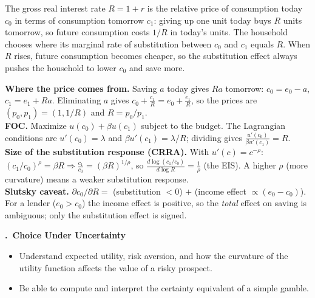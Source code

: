 \documentclass[11pt]{article}
\newcounter{qn}
\newcommand{\question}[1]{\par\needspace{14\baselineskip}\refstepcounter{qn}\medskip
{\bfseries\color{ink}\large \theqn.\ #1}\par\smallskip}
\begin{document}
\begin{resp}
The gross real interest rate $R=1+r$ is the relative price of consumption today $c_0$ in terms of consumption tomorrow $c_1$: giving up one unit today buys $R$ units tomorrow, so future consumption costs $1/R$ in today's units. The household chooses where its marginal rate of substitution between $c_0$ and $c_1$ equals $R$. When $R$ rises, future consumption becomes cheaper, so the substitution effect always pushes the household to lower $c_0$ and save more.
\end{resp}
\begin{intu}
\textbf{Where the price comes from.} Saving $a$ today gives $Ra$ tomorrow: $c_0=e_0-a$, $c_1=e_1+Ra$. Eliminating $a$ gives $c_0+\frac{c_1}{R}=e_0+\frac{e_1}{R}$, so the prices are $(p_0,p_1)=(1,1/R)$ and $R=p_0/p_1$.\\
\textbf{FOC.} Maximize $u(c_0)+\beta u(c_1)$ subject to the budget. The Lagrangian conditions are $u'(c_0)=\lambda$ and $\beta u'(c_1)=\lambda/R$; dividing gives $\frac{u'(c_0)}{\beta u'(c_1)}=R$.\\
\textbf{Size of the substitution response (CRRA).} With $u'(c)=c^{-\rho}$: $(c_1/c_0)^{\rho}=\beta R\Rightarrow \frac{c_1}{c_0}=(\beta R)^{1/\rho}$, so $\frac{d\log(c_1/c_0)}{d\log R}=\frac1\rho$ (the EIS). A higher $\rho$ (more curvature) means a weaker substitution response.\\
\textbf{Slutsky caveat.} $\partial c_0/\partial R=$ (substitution $<0$) $+$ (income effect $\propto (e_0-c_0)$). For a lender ($e_0>c_0$) the income effect is positive, so the \emph{total} effect on saving is ambiguous; only the substitution effect is signed.
\end{intu}

\question{Choice Under Uncertainty}
\begin{itemize}[leftmargin=1.2em,itemsep=0pt]\itshape
\item Understand expected utility, risk aversion, and how the curvature of the utility function affects the value of a risky prospect.
\item Be able to compute and interpret the certainty equivalent of a simple gamble.
\end{itemize}
\end{document}
